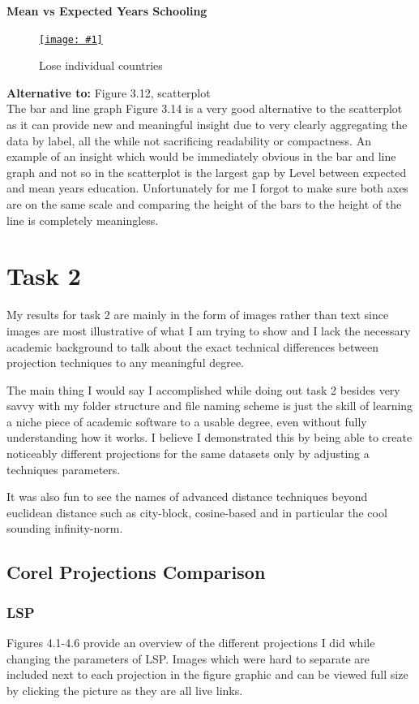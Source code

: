 \documentclass[11pt,a4paper,final]{article}
\newcommand\onlinefig[3]{
\begin{figure}[H]
  \centering
  \href{#3}{\texttt{[image: \#1]}}
  \caption{#2} 
  \label{fig:#1}
\end{figure}
}
\begin{document}
\begin{multicols}{2}
\vfill\null
\columnbreak
\begin{flushleft}
\textbf{Mean vs Expected Years Schooling}
\end{flushleft}
\onlinefig{mean_vs_expected_years_schooling_bar_and_linegraph}{Lose individual countries}{https://public.tableau.com/views/CS3205-HDI/Sheet4?:language=en-GB&:display_count=n&:origin=viz_share_link}

\textbf{Alternative to:} Figure 3.12, scatterplot
\\
The bar and line graph Figure 3.14 is a very good alternative to the scatterplot as it can provide new and meaningful insight due to very clearly aggregating the data by label, all the while not sacrificing readability or compactness.
An example of an insight which would be immediately obvious in the bar and line graph and not so in the scatterplot is the largest gap by Level between expected and mean years education. Unfortunately for me I forgot to make sure both axes are on the same scale and comparing the height of the bars to the height of the line is completely meaningless.

\end{multicols}
\pagebreak


\section{Task 2}
My results for task 2 are mainly in the form of images rather than text since images are most illustrative of what I am trying to show and I lack the necessary academic background to talk about the exact technical differences between projection techniques to any meaningful degree.

The main thing I would say I accomplished while doing out task 2 besides very savvy with my folder structure and file naming scheme is just the skill of learning a niche piece of academic software to a usable degree, even without fully understanding how it works. I believe I demonstrated this by being able to create noticeably different projections for the same datasets only by adjusting a techniques parameters.

It was also fun to see the names of advanced distance techniques beyond euclidean distance such as city-block, cosine-based and in particular the cool sounding infinity-norm.
\subsection{Corel Projections Comparison}
\subsubsection{LSP}
Figures 4.1-4.6 provide an overview of the different projections I did while changing the parameters of LSP. Images which were hard to separate are included next to each projection in the figure graphic and can be viewed full size by clicking the picture as they are all live links.
\end{document}
